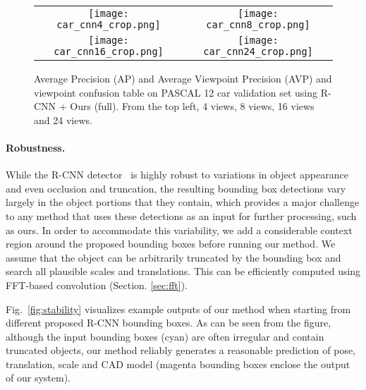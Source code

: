 \begin{figure}[h]
\setlength\tabcolsep{1pt}
\centering
\begin{tabular}{cc}
  \texttt{[image: car\_cnn4\_crop.png]} &   
  \texttt{[image: car\_cnn8\_crop.png]} \\   
  \texttt{[image: car\_cnn16\_crop.png]} &   
  \texttt{[image: car\_cnn24\_crop.png]} \\   
\end{tabular}
\caption{Average Precision (AP) and Average Viewpoint Precision (AVP)
  and viewpoint confusion table on PASCAL 12 car validation set using
  R-CNN + Ours (full). From the top left, 4 views, 8 views, 16 views
  and 24 views.}
  \label{fig:car_cnn_ap}
\end{figure}

\paragraph{Robustness.}
While the R-CNN detector~\cite{Girshick14} is highly robust to
variations in object appearance and even occlusion and truncation,
the resulting bounding box detections vary largely in the object
portions that they contain, which provides a major challenge to any
method that uses these detections as an input for further processing,
such as ours.
%
In order to accommodate this variability, we add a considerable context
region around the proposed bounding boxes before running our method.
We assume that the object can be arbitrarily truncated by the bounding
box and search all plausible scales and translations. This can be
efficiently computed using FFT-based convolution
(Section. \ref{sec:fft}).

Fig.~\ref{fig:stability} visualizes example outputs of our method when
starting from different proposed R-CNN bounding boxes. As can be seen
from the figure, although the input bounding boxes (cyan) are often
irregular and contain truncated objects, our method reliably
generates a reasonable prediction of pose, translation, scale and CAD
model (magenta bounding boxes enclose the output of our system).

